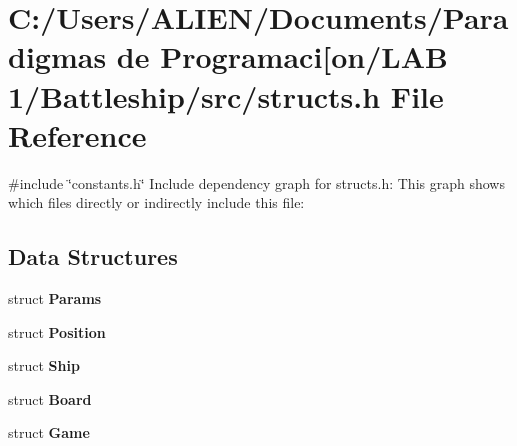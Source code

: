 \section{C\+:/\+Users/\+A\+L\+I\+E\+N/\+Documents/\+Paradigmas de Programaci[on/\+L\+AB 1/\+Battleship/src/structs.h File Reference}
\label{structs_8h}\index{C\+:/\+Users/\+A\+L\+I\+E\+N/\+Documents/\+Paradigmas de Programaci[on/\+L\+A\+B 1/\+Battleship/src/structs.\+h@{C\+:/\+Users/\+A\+L\+I\+E\+N/\+Documents/\+Paradigmas de Programaci[on/\+L\+A\+B 1/\+Battleship/src/structs.\+h}}
{\ttfamily \#include \char`\"{}constants.\+h\char`\"{}}\newline
Include dependency graph for structs.\+h\+:
This graph shows which files directly or indirectly include this file\+:
\subsection*{Data Structures}
\begin{DoxyCompactItemize}
\item 
struct {\bf Params}
\item 
struct {\bf Position}
\item 
struct {\bf Ship}
\item 
struct {\bf Board}
\item 
struct {\bf Game}
\end{DoxyCompactItemize}
